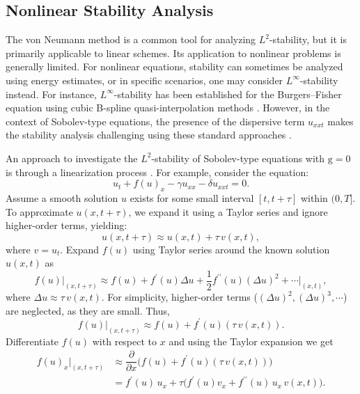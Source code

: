 \documentclass[11pt,a4paper]{amsart}
\theoremstyle{plain}
\theoremstyle{definition}
\theoremstyle{remark}
\numberwithin{equation}{section}
\begin{document}
\subsection{Nonlinear Stability Analysis}
The von Neumann method is a common tool for analyzing $L^2$-stability, but it is primarily applicable to linear schemes. Its application to nonlinear problems is generally limited. For nonlinear equations, stability can sometimes be analyzed using energy estimates, or in specific scenarios, one may consider $L^\infty$-stability instead. For instance, $L^\infty$-stability has been established for the Burgers–Fisher equation using cubic B-spline quasi-interpolation methods \cite{zhu2010numerical}. However, in the context of Sobolev-type equations, the presence of the dispersive term $u_{xxt}$ makes the stability analysis challenging using these standard approaches \cite{kumar2016b}.\par
An approach to investigate the $L^2$-stability of Sobolev-type equations with $\mathrm{g} = 0$ is through a linearization process \cite{strang1964accurate}. For example, consider the equation:
\begin{equation}
    u_t + f(u)_x - \gamma u_{xx} - \delta u_{xxt} = 0.
\end{equation}
Assume a smooth solution $u$ exists for some small interval $[t, t+\tau]$ within $(0, T]$. To approximate $u(x, t + \tau)$, we expand it using a Taylor series and ignore higher-order terms, yielding:
\begin{equation}\label{eqn:NLS1}
    u(x, t+\tau) \approx u(x, t) + \tau \, v(x, t),
\end{equation}
where $v = u_t$.  Expand $f(u)$ using Taylor series around the known solution $u(x,t)$ as
\begin{equation}
    f(u)\bigg|_{(x, t+\tau)} \approx f(u) + f^\prime(u) \Delta u + \dfrac{1}{2} f^{\prime \prime}(u)(\Delta u)^2 + \cdots \bigg|_{(x, t)} ,
\end{equation}
where $\Delta u \approx \tau \, v(x, t)$. For simplicity, higher-order terms ($(\Delta u)^2, (\Delta u)^3, \cdots $) are neglected, as they are small. Thus, 
\begin{equation}\label{eqn:NLS2}
    f(u)\bigg|_{(x, t+\tau)} \approx f(u) + f^\prime(u) (\tau\, v(x, t)).
\end{equation}
Differentiate $f(u)$ with respect to $x$ and using the Taylor expansion we get
\begin{equation}\label{eqn:NLS3}
\begin{split}
    f(u)_x\bigg|_{(x, t+\tau)} & \approx \dfrac{\partial}{\partial x} \biggl(f(u) + f^\prime(u) (\tau\, v(x, t))\biggr)\\    
    &= f^\prime(u)\, u_x + \tau \biggl(f^\prime(u) v_x + f^{\prime \prime}(u)\, u_x\, v(x,t)\biggr).
\end{split}
\end{equation}
\end{document}
